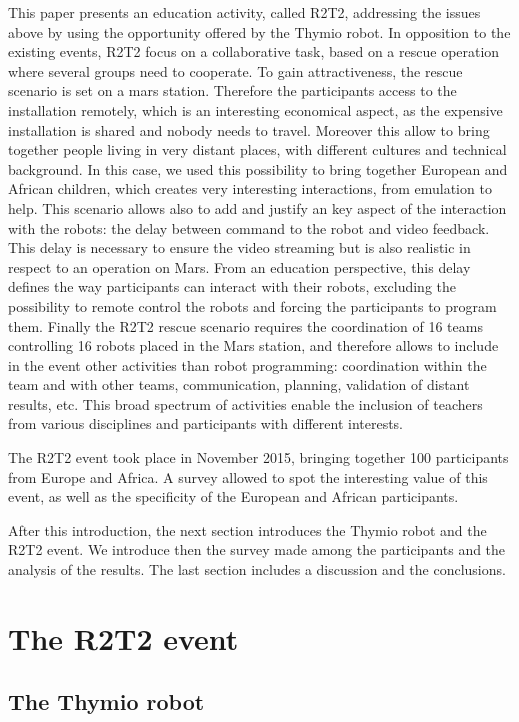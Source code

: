 \documentclass{intech-journal}
\begin{document}
This paper presents an education activity, called R2T2, addressing the issues above by using the opportunity offered by the Thymio robot. 
In opposition to the existing events, R2T2 focus on a collaborative task, based on a rescue operation where several groups need to cooperate.
To gain attractiveness, the rescue scenario is set on a mars station. 
Therefore the participants access to the installation remotely, which is an interesting economical aspect, as the expensive installation is shared and nobody needs to travel.
Moreover this allow to bring together people living in very distant places, with different cultures and technical background. In this case, we used this possibility to bring together European and African children, which creates very interesting interactions, from emulation to help.
This scenario allows also to add and justify an key aspect of the interaction with the robots: the delay between command to the robot and video feedback. 
This delay is necessary to ensure the video streaming but is also realistic in respect to an operation on Mars.
From an education perspective, this delay defines the way participants can interact with their robots, excluding the possibility to remote control the robots and forcing the participants to program them.
Finally the R2T2 rescue scenario requires the coordination of 16 teams controlling 16 robots placed in the Mars station, and therefore allows to include in the event other activities than robot programming: coordination within the team and with other teams, communication, planning, validation of distant results, etc.
This broad spectrum of activities enable the inclusion of teachers from various disciplines and participants with different interests.

The R2T2 event took place in November 2015, bringing together 100 participants from Europe and Africa. 
A survey allowed to spot the interesting value of this event, as well as the specificity of the European and African participants.

After this introduction, the next section introduces the Thymio robot and the R2T2 event. 
We introduce then the survey made among the participants and the analysis of the results. 
The last section includes a discussion and the conclusions.


\section{The R2T2 event}

\subsection{The Thymio robot}
\end{document}
